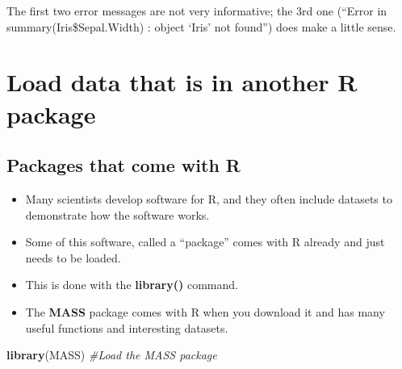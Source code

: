 \documentclass[]{book}
\newenvironment{Shaded}{\begin{snugshade}}{\end{snugshade}}
\newcommand{\KeywordTok}[1]{\textcolor[rgb]{0.13,0.29,0.53}{\textbf{#1}}}
\newcommand{\CommentTok}[1]{\textcolor[rgb]{0.56,0.35,0.01}{\textit{#1}}}
\newcommand{\OperatorTok}[1]{\textcolor[rgb]{0.81,0.36,0.00}{\textbf{#1}}}
\newcommand{\NormalTok}[1]{#1}
\providecommand{\tightlist}{%
  \setlength{\itemsep}{0pt}\setlength{\parskip}{0pt}}
\theoremstyle{definition}
\theoremstyle{definition}
\theoremstyle{definition}
\theoremstyle{remark}
\begin{document}
\begin{Shaded}
\end{Shaded}

The first two error messages are not very informative; the 3rd one
(``Error in summary(Iris\$Sepal.Width) : object `Iris' not found'') does
make a little sense.

\section{Load data that is in another R
package}\label{load-data-that-is-in-another-r-package}

\subsection{Packages that come with R}\label{packages-that-come-with-r}

\begin{itemize}
\tightlist
\item
  Many scientists develop software for R, and they often include
  datasets to demonstrate how the software works.\\
\item
  Some of this software, called a ``package'' comes with R already and
  just needs to be loaded.\\
\item
  This is done with the \textbf{library()} command.
\item
  The \textbf{MASS} package comes with R when you download it and has
  many useful functions and interesting datasets.
\end{itemize}

\begin{Shaded}
\begin{Highlighting}[]
\KeywordTok{library}\NormalTok{(MASS) }\CommentTok{#Load the MASS package}
\end{Highlighting}
\end{Shaded}
\end{document}
